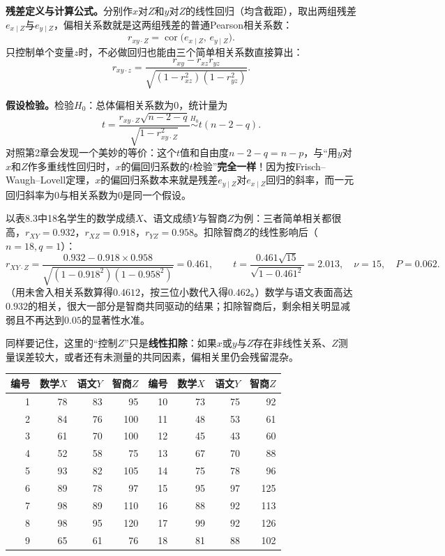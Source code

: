 \textbf{残差定义与计算公式。}分别作$x$对$Z$和$y$对$Z$的线性回归（均含截距），取出两组残差$e_{x\mid Z}$与$e_{y\mid Z}$，偏相关系数就是这两组残差的普通Pearson相关系数：
\[
r_{xy\cdot Z}=\operatorname{cor}\bigl(e_{x\mid Z},\,e_{y\mid Z}\bigr).
\]
只控制单个变量$z$时，不必做回归也能由三个简单相关系数直接算出：
\[
r_{xy\cdot z}=\frac{r_{xy}-r_{xz}r_{yz}}{\sqrt{(1-r_{xz}^2)(1-r_{yz}^2)}} .
\]

\textbf{假设检验。}检验$H_0$：总体偏相关系数为0，统计量为
\[
t=\frac{r_{xy\cdot Z}\sqrt{n-2-q}}{\sqrt{1-r_{xy\cdot Z}^2}}\overset{H_0}{\sim}t(n-2-q).
\]
对照第2章会发现一个美妙的等价：这个$t$值和自由度$n-2-q=n-p$，与“用$y$对$x$和$Z$作多重线性回归时，$x$的偏回归系数的$t$检验”\textbf{完全一样}！因为按Frisch--Waugh--Lovell定理，$x$的偏回归系数本来就是残差$e_{y\mid Z}$对$e_{x\mid Z}$回归的斜率，而一元回归斜率为0与相关系数为0是同一个假设。

以表8.3中18名学生的数学成绩$X$、语文成绩$Y$与智商$Z$为例：三者简单相关都很高，$r_{XY}=0.932$，$r_{XZ}=0.918$，$r_{YZ}=0.958$。扣除智商$Z$的线性影响后（$n=18,q=1$）：
\[
r_{XY\cdot Z}=\frac{0.932-0.918\times0.958}{\sqrt{(1-0.918^2)(1-0.958^2)}}=0.461,
\qquad
t=\frac{0.461\sqrt{15}}{\sqrt{1-0.461^2}}=2.013,\quad \nu=15,\quad P=0.062 .
\]
（用未舍入相关系数算得$0.4612$，按三位小数代入得$0.462$。）数学与语文表面高达$0.932$的相关，很大一部分是智商共同驱动的结果；扣除智商后，剩余相关明显减弱且不再达到$0.05$的显著性水准。

同样要记住，这里的“控制$Z$”只是\textbf{线性扣除}：如果$x$或$y$与$Z$存在非线性关系、$Z$测量误差较大，或者还有未测量的共同因素，偏相关里仍会残留混杂。
\par\noindent\begin{minipage}{\linewidth}
\begin{center}\small\begin{tabular}{rrrr@{\qquad}rrrr}
\toprule 编号&数学$X$&语文$Y$&智商$Z$&编号&数学$X$&语文$Y$&智商$Z$\\\midrule
1&78&83&95&10&73&75&92\\
2&84&76&100&11&48&53&61\\
3&61&70&100&12&45&43&60\\
4&52&58&75&13&67&70&88\\
5&93&82&105&14&75&78&96\\
6&89&78&97&15&95&97&125\\
7&98&89&110&16&88&92&113\\
8&98&95&120&17&99&92&126\\
9&65&61&76&18&81&88&102\\\bottomrule
\end{tabular}\end{center}
\end{minipage}\par\medskip

